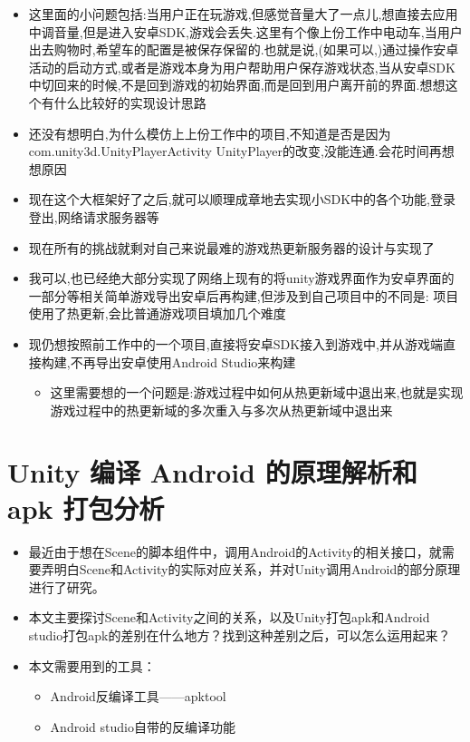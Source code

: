 \documentclass[9pt, b5paper]{article}
\begin{document}
\begin{itemize}
\item 这里面的小问题包括:当用户正在玩游戏,但感觉音量大了一点儿,想直接去应用中调音量,但是进入安卓SDK,游戏会丢失.这里有个像上份工作中电动车,当用户出去购物时,希望车的配置是被保存保留的.也就是说,(如果可以,)通过操作安卓活动的启动方式,或者是游戏本身为用户帮助用户保存游戏状态,当从安卓SDK中切回来的时候,不是回到游戏的初始界面,而是回到用户离开前的界面.想想这个有什么比较好的实现设计思路
\item 还没有想明白,为什么模仿上上份工作中的项目,不知道是否是因为com.unity3d.UnityPlayerActivity UnityPlayer的改变,没能连通.会花时间再想想原因
\item 现在这个大框架好了之后,就可以顺理成章地去实现小SDK中的各个功能,登录登出,网络请求服务器等
\item 现在所有的挑战就剩对自己来说最难的游戏热更新服务器的设计与实现了

\item 我可以,也已经绝大部分实现了网络上现有的将unity游戏界面作为安卓界面的一部分等相关简单游戏导出安卓后再构建,但涉及到自己项目中的不同是: 项目使用了热更新,会比普通游戏项目填加几个难度
\item 现仍想按照前工作中的一个项目,直接将安卓SDK接入到游戏中,并从游戏端直接构建,不再导出安卓使用Android Studio来构建 
\begin{itemize}
\item 这里需要想的一个问题是:游戏过程中如何从热更新域中退出来,也就是实现游戏过程中的热更新域的多次重入与多次从热更新域中退出来
\end{itemize}
\end{itemize}







\section{Unity 编译 Android 的原理解析和 apk 打包分析}
\label{sec-2}
\begin{itemize}
\item 最近由于想在Scene的脚本组件中，调用Android的Activity的相关接口，就需要弄明白Scene和Activity的实际对应关系，并对Unity调用Android的部分原理进行了研究。
\item 本文主要探讨Scene和Activity之间的关系，以及Unity打包apk和Android studio打包apk的差别在什么地方？找到这种差别之后，可以怎么运用起来？
\item 本文需要用到的工具：
\begin{itemize}
\item Android反编译工具——apktool
\item Android studio自带的反编译功能
\end{itemize}
\end{itemize}
\end{document}
